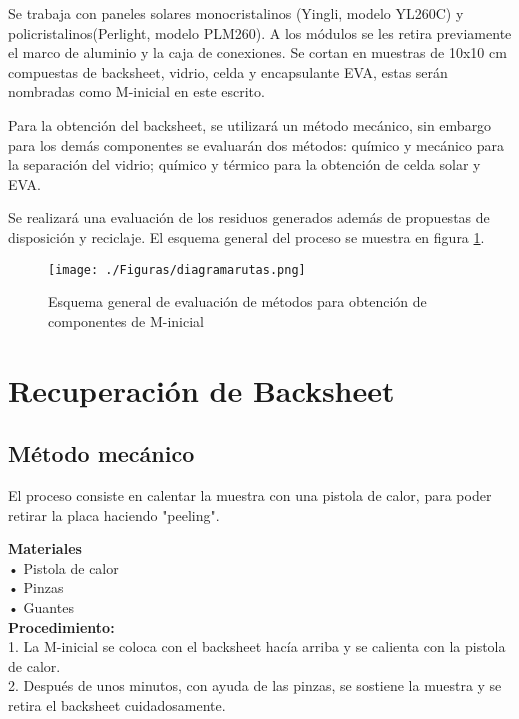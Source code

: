 Se trabaja con paneles solares monocristalinos (Yingli, modelo YL260C) y policristalinos(Perlight, modelo PLM260). A los módulos se les retira previamente el marco de aluminio y la caja de conexiones. Se cortan en muestras de 10x10 cm compuestas de backsheet, vidrio, celda y encapsulante EVA, estas serán nombradas como M-inicial en este escrito. 

Para la obtención del backsheet, se utilizará un método mecánico, sin embargo para los demás componentes se evaluarán dos métodos: químico y mecánico para la separación del vidrio; químico y térmico para la obtención de celda solar y EVA. 

Se realizará una evaluación de los residuos generados además de propuestas de disposición y reciclaje. El esquema general del proceso se muestra en figura \ref{fig:EsquemaGeneral}.   

\begin{figure}[htb]
	\begin{center}
		\texttt{[image: ./Figuras/diagramarutas.png]}
	\end{center}
	\vspace{-1em} %
	\caption{Esquema general de evaluación de métodos para obtención de componentes de M-inicial}
	\label{fig:EsquemaGeneral}
\end{figure}

\section{Recuperación de Backsheet}
\label{sec:Backsheet}

\subsection{Método mecánico}
\label{sec:Metodo mecánico}


 El proceso consiste en calentar la muestra con una pistola de calor, para poder retirar la placa haciendo "peeling". 


\textbf{Materiales}\\ 
• Pistola de calor\\ 
• Pinzas\\  
• Guantes\\ 

\textbf{Procedimiento:}\\ 
1.	La M-inicial se coloca con el backsheet hacía arriba y se calienta con la pistola de calor.\\ 
2. Después de unos minutos, con ayuda de las pinzas, se sostiene la muestra y se retira el backsheet cuidadosamente. \\

